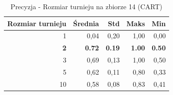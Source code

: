 \begin{table}[htbp]
\centering
\small
\setlength{\tabcolsep}{6pt}
\renewcommand{\arraystretch}{1.2}
\caption{Precyzja - Rozmiar turnieju na zbiorze 14 (CART)}
\label{tab:CART_tournament_size_14_precision}
\begin{tabular}{r|r|r|r|r}
\toprule
Rozmiar turnieju & Średnia & Std & Maks & Min \\
\hline
1 & 0,04 & 0,20 & 1,00 & 0,00 \\
\textbf{2} & \textbf{0.72} & \textbf{0.19} & \textbf{1.00} & \textbf{0.50} \\
3 & 0,69 & 0,13 & 1,00 & 0,50 \\
5 & 0,62 & 0,11 & 0,80 & 0,33 \\
10 & 0,58 & 0,08 & 0,83 & 0,41 \\
\bottomrule
\end{tabular}
\end{table}